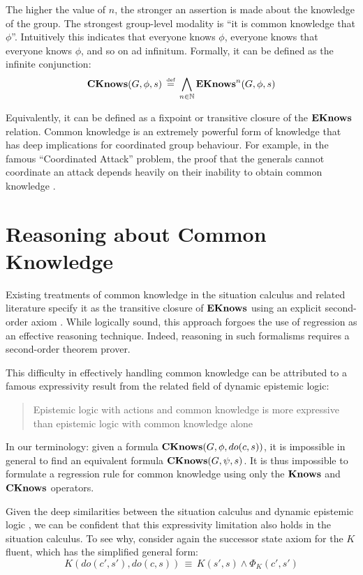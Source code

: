 The higher the value of $n$, the stronger an assertion is made about
the knowledge of the group. The strongest group-level modality is
{}``it is common knowledge that $\phi$''. Intuitively this indicates
that everyone knows $\phi$, everyone knows that everyone knows $\phi$,
and so on ad infinitum. Formally, it can be defined as the infinite
conjunction:\[
\mathbf{CKnows}(G,\phi,s)\,\stackrel{\mbox{\tiny def}}{=}\,\bigwedge_{n\in\mathbb{N}}\mathbf{EKnows}^{n}(G,\phi,s)\]


Equivalently, it can be defined as a fixpoint or transitive closure
of the $\mathbf{EKnows}$ relation. Common knowledge is an extremely powerful
form of knowledge that has deep implications for coordinated group
behaviour. For example, in the famous {}``Coordinated Attack'' problem,
the proof that the generals cannot coordinate an attack depends heavily
on their inability to obtain common knowledge \citep{halpern90knowledge_distrib}.


\section{Reasoning about Common Knowledge}

Existing treatments of common knowledge in the situation calculus
and related literature specify it as the transitive closure of $\mathbf{EKnows}$
using an explicit second-order axiom \citep{davis05fo_ma_theory,ghaderi07sc_joint_ability}.
While logically sound, this approach forgoes the use of regression
as an effective reasoning technique. Indeed, reasoning in such formalisms
requires a second-order theorem prover.

This difficulty in effectively handling common knowledge can be attributed
to a famous expressivity result from the related field of dynamic
epistemic logic:

\begin{quote}
Epistemic logic with actions and common knowledge is more expressive
than epistemic logic with common knowledge alone \citep{baltag98pa_ck} 
\end{quote}
In our terminology: given a formula $\mathbf{CKnows}(G,\phi,do(c,s))$, it
is impossible in general to find an equivalent formula $\mathbf{CKnows}(G,\psi,s)$.
It is thus impossible to formulate a regression rule for common knowledge
using only the $\mathbf{Knows}$ and $\mathbf{CKnows}$ operators.

Given the deep similarities between the situation calculus and dynamic
epistemic logic \citep{vanbentham07ml_sitcalc}, we can be confident
that this expressivity limitation also holds in the situation calculus.
To see why, consider again the successor state axiom for the $K$
fluent, which has the simplified general form:\[
K(do(c',s'),do(c,s))\,\equiv\, K(s',s)\wedge\Phi_{K}(c',s')\]


